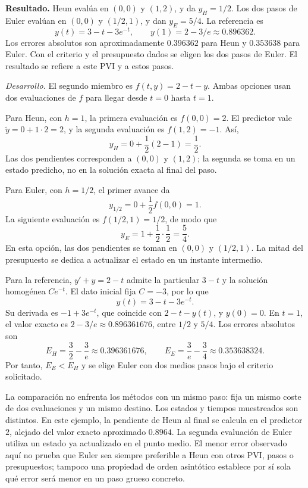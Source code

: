 \noindent\textbf{Resultado.} Heun evalúa en \((0,0)\) y \((1,2)\), y da \(y_H=1/2\). Los dos pasos de Euler evalúan en \((0,0)\) y \((1/2,1)\), y dan \(y_E=5/4\). La referencia es
\[
y(t)=3-t-3e^{-t},\qquad y(1)=2-3/e\approx0.896362.
\]
Los errores absolutos son aproximadamente \(0.396362\) para Heun y \(0.353638\) para Euler. Con el criterio y el presupuesto dados se eligen los dos pasos de Euler. El resultado se refiere a este PVI y a estos pasos.

\noindent\textit{Desarrollo.} El segundo miembro es \(f(t,y)=2-t-y\). Ambas opciones usan dos evaluaciones de \(f\) para llegar desde \(t=0\) hasta \(t=1\).

Para Heun, con \(h=1\), la primera evaluación es \(f(0,0)=2\). El predictor vale \(\widetilde y=0+1\cdot2=2\), y la segunda evaluación es \(f(1,2)=-1\). Así,
\[
y_H=0+\frac12(2-1)=\frac12.
\]
Las dos pendientes corresponden a \((0,0)\) y \((1,2)\); la segunda se toma en un estado predicho, no en la solución exacta al final del paso.

Para Euler, con \(h=1/2\), el primer avance da
\[
y_{1/2}=0+\frac12 f(0,0)=1.
\]
La siguiente evaluación es \(f(1/2,1)=1/2\), de modo que
\[
y_E=1+\frac12\cdot\frac12=\frac54.
\]
En esta opción, las dos pendientes se toman en \((0,0)\) y \((1/2,1)\). La mitad del presupuesto se dedica a actualizar el estado en un instante intermedio.

Para la referencia, \(y'+y=2-t\) admite la particular \(3-t\) y la solución homogénea \(Ce^{-t}\). El dato inicial fija \(C=-3\), por lo que
\[
y(t)=3-t-3e^{-t}.
\]
Su derivada es \(-1+3e^{-t}\), que coincide con \(2-t-y(t)\), y \(y(0)=0\). En \(t=1\), el valor exacto es \(2-3/e\approx0.896361676\), entre \(1/2\) y \(5/4\). Los errores absolutos son
\[
E_H=\frac32-\frac3e\approx0.396361676,
\qquad
E_E=\frac3e-\frac34\approx0.353638324.
\]
Por tanto, \(E_E<E_H\) y se elige Euler con dos medios pasos bajo el criterio solicitado.

La comparación no enfrenta los métodos con un mismo paso: fija un mismo coste de dos evaluaciones y un mismo destino. Los estados y tiempos muestreados son distintos. En este ejemplo, la pendiente de Heun al final se calcula en el predictor \(2\), alejado del valor exacto aproximado \(0.8964\). La segunda evaluación de Euler utiliza un estado ya actualizado en el punto medio. El menor error observado aquí no prueba que Euler sea siempre preferible a Heun con otros PVI, pasos o presupuestos; tampoco una propiedad de orden asintótico establece por sí sola qué error será menor en un paso grueso concreto.
